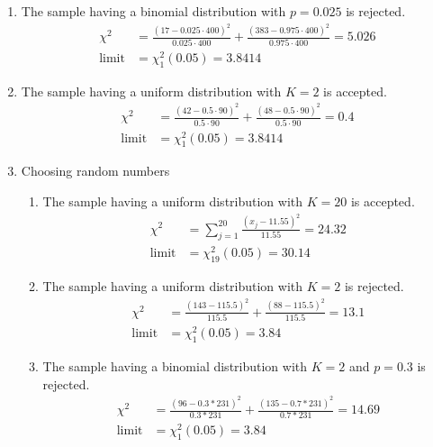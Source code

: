 \begin{enumerate}
    \item The sample having a binomial distribution with
          $ p = 0.025 $ is \textcolor{y_p}{rejected}.
          \begin{align}
              \chi^2       & = \frac{(17 - 0.025 \cdot 400)^2}{0.025 \cdot 400}
              + \frac{(383 - 0.975 \cdot 400)^2}{0.975 \cdot 400} = 5.026       \\
              \text{limit} & = \chi^2_{1}(0.05) = 3.8414
          \end{align}

    \item The sample having a uniform distribution with $ K = 2 $ is
          \textcolor{y_h}{accepted}.
          \begin{align}
              \chi^2       & = \frac{(42 - 0.5 \cdot 90)^2}{0.5 \cdot 90}
              + \frac{(48 - 0.5 \cdot 90)^2}{0.5 \cdot 90} = 0.4          \\
              \text{limit} & = \chi^2_{1}(0.05) = 3.8414
          \end{align}

    \item Choosing random numbers
          \begin{enumerate}
              \item The sample having a uniform distribution with $ K = 20 $ is
                    \textcolor{y_h}{accepted}.
                    \begin{align}
                        \chi^2       & = \sum_{j=1}^{20} \frac{(x_j - 11.55)^2}{11.55}
                        = 24.32                                                        \\
                        \text{limit} & = \chi^2_{19}(0.05) = 30.14
                    \end{align}
              \item The sample having a uniform distribution with $ K = 2 $ is
                    \textcolor{y_p}{rejected}.
                    \begin{align}
                        \chi^2       & = \frac{(143 - 115.5)^2}{115.5}
                        + \frac{(88 - 115.5)^2}{115.5} = 13.1          \\
                        \text{limit} & = \chi^2_{1}(0.05) = 3.84
                    \end{align}
              \item The sample having a binomial distribution with $ K = 2 $ and
                    $ p = 0.3 $ is
                    \textcolor{y_p}{rejected}.
                    \begin{align}
                        \chi^2       & = \frac{(96 - 0.3*231)^2}{0.3*231}
                        + \frac{(135 - 0.7*231)^2}{0.7*231} = 14.69       \\
                        \text{limit} & = \chi^2_{1}(0.05) = 3.84
                    \end{align}
          \end{enumerate}


\end{enumerate}
